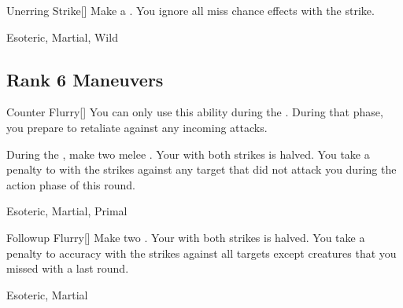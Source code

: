 \lowercase{\hypertarget{maneuver:Unerring Strike}{}}\label{maneuver:Unerring Strike}
\hypertarget{maneuver:Unerring Strike}{}
\begin{freeability}[Rank 5]{Unerring Strike}[]
Make a .
You ignore all miss chance effects with the strike.


 Esoteric, Martial, Wild
\end{freeability}
\vspace{0.25em}


\subsection{Rank 6 Maneuvers}

\lowercase{\hypertarget{maneuver:Counter Flurry}{}}\label{maneuver:Counter Flurry}
\hypertarget{maneuver:Counter Flurry}{}
\begin{freeability}[Rank 6]{Counter Flurry}[]
You can only use this ability during the .
During that phase, you prepare to retaliate against any incoming attacks.

During the , make two melee .
Your  with both strikes is halved.
You take a  penalty to  with the strikes against any target that did not attack you during the action phase of this round.


 Esoteric, Martial, Primal
\end{freeability}
\vspace{0.25em}



\lowercase{\hypertarget{maneuver:Followup Flurry}{}}\label{maneuver:Followup Flurry}
\hypertarget{maneuver:Followup Flurry}{}
\begin{freeability}[Rank 6]{Followup Flurry}[]
Make two .
Your  with both strikes is halved.
You take a  penalty to accuracy with the strikes against all targets except creatures that you missed with a  last round.


 Esoteric, Martial
\end{freeability}
\vspace{0.25em}



